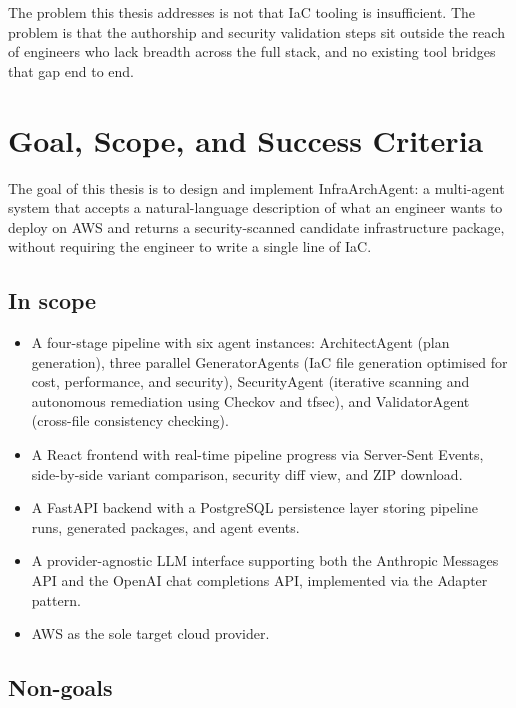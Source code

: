 The problem this thesis addresses is not that IaC tooling is insufficient.
The problem is that the authorship and security validation steps sit outside
the reach of engineers who lack breadth across the full stack, and no
existing tool bridges that gap end to end.

\section{Goal, Scope, and Success Criteria}
\label{sec:goal}

The goal of this thesis is to design and implement InfraArchAgent: a
multi-agent system that accepts a natural-language description of what an
engineer wants to deploy on AWS and returns a security-scanned candidate
infrastructure package, without requiring the engineer to write a single
line of IaC.

\subsection*{In scope}

\begin{itemize}
  \item A four-stage pipeline with six agent instances: ArchitectAgent
    (plan generation), three parallel GeneratorAgents (IaC file generation
    optimised for cost, performance, and security), SecurityAgent (iterative
    scanning and autonomous remediation using Checkov and tfsec), and
    ValidatorAgent (cross-file consistency checking).
  \item A React frontend with real-time pipeline progress via Server-Sent
    Events, side-by-side variant comparison, security diff view, and ZIP
    download.
  \item A FastAPI backend with a PostgreSQL persistence layer storing
    pipeline runs, generated packages, and agent events.
  \item A provider-agnostic LLM interface supporting both the Anthropic
    Messages API and the OpenAI chat completions API, implemented via
    the Adapter pattern.
  \item AWS as the sole target cloud provider.
\end{itemize}

\subsection*{Non-goals}

